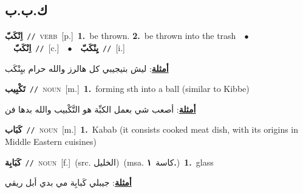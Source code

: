 \documentclass[10pt,a4paper,twoside]{article} %
\begin{document}
\begin{multicols}{2}
\vspace{-3mm}
\subsection*{\color{blue}\foreignlanguage{arabic}{ك.ب.ب}\color{blue}{}} 

{\setlength\topsep{0pt}\textbf{\foreignlanguage{arabic}{اِنْكَبّ}}\ {\color{gray}\texttt{//}\color{black}}\ \textsc{verb}\ [p.]\ \textbf{1.}~be thrown.  \textbf{2.}~be thrown into the trash\ \ $\bullet$\ \ \setlength\topsep{0pt}\textbf{\foreignlanguage{arabic}{اِنْكَبّ}}\ {\color{gray}\texttt{//}\color{black}}\ [c.]\ \ $\bullet$\ \ \setlength\topsep{0pt}\textbf{\foreignlanguage{arabic}{يِنْكَبّ}}\ {\color{gray}\texttt{//}\color{black}}\ [i.]\  \begin{flushright}\color{gray}\foreignlanguage{arabic}{\textbf{\underline{\foreignlanguage{arabic}{أمثلة}}}: ليش بتيجيبي كل هالرز والله حرام بيِنْكَب}\end{flushright}\color{black}} \vspace{2mm}

{\setlength\topsep{0pt}\textbf{\foreignlanguage{arabic}{تَكْبِيب}}\ {\color{gray}\texttt{//}\color{black}}\ \textsc{noun}\ [m.]\ \textbf{1.}~forming sth into a ball (similar to Kibbe)\  \begin{flushright}\color{gray}\foreignlanguage{arabic}{\textbf{\underline{\foreignlanguage{arabic}{أمثلة}}}: أصعب شي بعمل الكبِّة هو التَّكْبيب والله بدها فن}\end{flushright}\color{black}} \vspace{2mm}

{\setlength\topsep{0pt}\textbf{\foreignlanguage{arabic}{كَبَاب}}\ {\color{gray}\texttt{//}\color{black}}\ \textsc{noun}\ [m.]\ \textbf{1.}~Kabab (it consists cooked meat dish, with its origins in Middle Eastern cuisines)\ } \vspace{2mm}

{\setlength\topsep{0pt}\textbf{\foreignlanguage{arabic}{كَبَابِة}}\ {\color{gray}\texttt{//}\color{black}}\ \textsc{noun}\ [f.]\ (src. \color{gray}\foreignlanguage{arabic}{الخليل}\color{black})\ \color{gray}(msa. \foreignlanguage{arabic}{كاسة}~\foreignlanguage{arabic}{\textbf{١.}})\color{black}\ \textbf{1.}~glass\  \begin{flushright}\color{gray}\foreignlanguage{arabic}{\textbf{\underline{\foreignlanguage{arabic}{أمثلة}}}: جيبلي كَبابِة مي بدي أبل ريقي}\end{flushright}\color{black}} \vspace{2mm}


\end{multicols}
\end{document}
